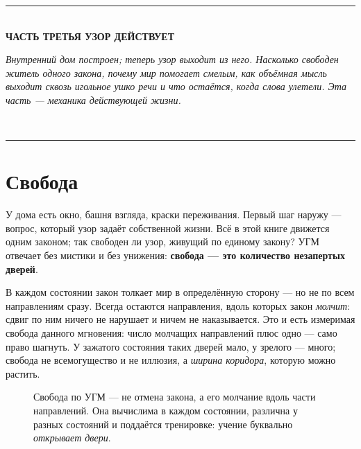 \documentclass[11pt,letterpaper]{article}
\newcommand{\stT}{\textbf{[Т]}\xspace}
\newcommand{\partline}[2]{%
  \clearpage\vspace*{4pt}\begin{center}
  {\color{fact}\rule{0.55\textwidth}{0.4pt}}\\[9pt]
  {\large\bfseries #1}\\[7pt]
  \begin{minipage}{0.82\textwidth}\centering\small\itshape\color{plosgray} #2\end{minipage}\\[9pt]
  {\color{fact}\rule{0.55\textwidth}{0.4pt}}
  \end{center}\bigskip}
\begin{document}
\partline{ЧАСТЬ ТРЕТЬЯ \;\textperiodcentered\; УЗОР ДЕЙСТВУЕТ}{Внутренний дом построен;
теперь узор выходит из него. Насколько свободен житель одного закона, почему мир помогает
смелым, как объёмная мысль выходит сквозь игольное ушко речи и что остаётся, когда слова
улетели. Эта часть --- механика действующей жизни.}

\section{Свобода}
\label{sec:freedom}

У дома есть окно, башня взгляда, краски переживания. Первый шаг
наружу --- вопрос, который узор задаёт собственной жизни. Всё в этой книге
движется одним законом; так свободен ли узор, живущий по единому
закону? УГМ отвечает без мистики и без унижения: \textbf{свобода ---
это количество незапертых дверей}.

В каждом состоянии закон толкает мир в определённую сторону --- но
не по всем направлениям сразу. Всегда остаются направления, вдоль
которых закон \emph{молчит}: сдвиг по ним ничего не нарушает и ничем
не наказывается. Это и есть измеримая свобода данного мгновения:
число молчащих направлений плюс одно --- само право шагнуть.
У зажатого состояния таких дверей мало, у зрелого --- много;
свобода не всемогущество и не иллюзия, а \emph{ширина коридора},
которую можно растить.

\begin{figure}[H]
\centering
{}
\caption{Свобода по УГМ --- не отмена закона, а его молчание вдоль
части направлений. Она вычислима в каждом состоянии, различна у
разных состояний и поддаётся тренировке: учение буквально
\emph{открывает двери}.}
\label{fig:doors}
\end{figure}
\end{document}
